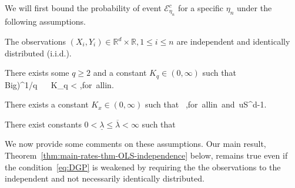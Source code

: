 \documentclass{article}
\begin{document}
 
 We will first bound the probability of event $\mathcal{E}_{\eta_n}^c$ for a specific $\eta_n$ under the following assumptions. 
 \begin{description}
 	\item The observations $(X_i, Y_i)\in\mathbb{R}^d\times\mathbb{R}, 1\le i\le n$ are independent and identically distributed (i.i.d.).
 	\item There exists some $q \ge 2$ and a constant $K_q\in(0, \infty)$ such that
 	\\Big)^{1/q} ~\le~ K_q < \infty,\quad\mbox{for all}\le i\le n. 
 	\]
 	\item There exists a constant $K_x\in(0, \infty)$ such that
 	\ ,\quad\mbox{for all}\le i\le n\mbox{ and }u\in S^{d-1}.
 	\]
 	\item There exist constants $0 < \underline{\lambda} \le \overline{\lambda} < \infty$ such that
 	\
 \end{description}
 We now provide some comments on these assumptions. Our main result, Theorem~\ref{thm:main-rates-thm-OLS-independence} below, remains true even if the condition~\ref{eq:DGP} 
 is weakened by requiring the the observations to the independent and not necessarily identically distributed.
  
\end{document}
